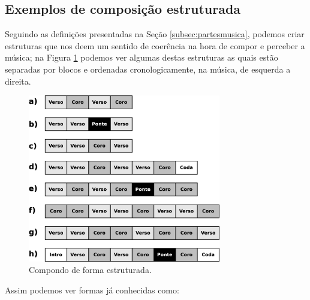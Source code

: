 

\subsection{Exemplos de composição estruturada}
\label{subsec:expartesmusica}

Seguindo as definições presentadas na Seção \ref{subsec:partesmusica},
podemos criar estruturas que nos deem um sentido de coerência na hora de compor e perceber a música;
na Figura \ref{fig:partes-musica-ex1} podemos ver algumas destas estruturas 
as quais estão separadas por blocos e ordenadas cronologicamente, na música, de esquerda a direita.
     \begin{figure}[!ht]
	     \centering
	     \includegraphics[width=0.75\textwidth]{chapters/cap-musica-topicos/partes-musica-ex1.eps}
	     \caption{Compondo de forma estruturada.}
	     \label{fig:partes-musica-ex1}
     \end{figure}
Assim podemos ver formas já conhecidas como:
